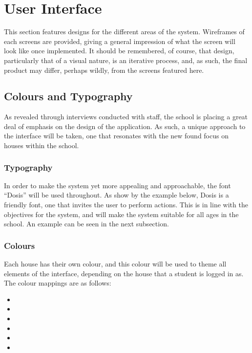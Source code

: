 \section{User Interface}
This section features designs for the different areas of the system. Wireframes of each screens are provided, giving a general impression of what the screen will look like once implemented. It should be remembered, of course, that design, particularly that of a visual nature, is an iterative process, and, as such, the final product may differ, perhaps wildly, from the screens featured here.

\subsection{Colours and Typography}
As revealed through interviews conducted with staff, the school is placing a great deal of emphasis on the design of the application. As such, a unique approach to the interface will be taken, one that resonates with the new found focus on houses within the school.

\subsubsection{Typography}
In order to make the system yet more appealing and approachable, the font ``Dosis'' will be used throughout. As show by the example below, Dosis is a friendly font, one that invites the user to perform actions. This is in line with the objectives for the system, and will make the system suitable for all ages in the school. An example can be seen in the next subsection.

\subsubsection{Colours}
Each house has their own colour, and this colour will be used to theme all elements of the interface, depending on the house that a student is logged in as. The colour mappings are as follows:

\begin{itemize}[leftmargin=*]
  \item \dosis{\textcolor{specialblue}{Acton (Blue)}}
  \item \dosis{\textcolor{specialorange}{Baxter (Orange)}}
  \item \dosis{\textcolor{specialgreen}{Clive (Green)}}
  \item \dosis{\textcolor{specialpurple}{Darwin (Purple)}}
  \item \dosis{\textcolor{specialred}{Houseman (Red)}}
  \item \dosis{\textcolor{specialyellow}{Webb (Yellow)}}
\end{itemize}

